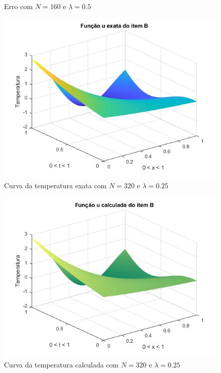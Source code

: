 \documentclass[12pt]{article}
\begin{document}
\begin{spacing}{1.5}
\begin{figure}
    \caption{Erro com $N=160$ e $\lambda=0.5$}
    \label{fig:B_n160lambda0-5_erro}
\end{figure}


\begin{figure}
    \centering
    \includegraphics[width=0.8\linewidth]{Primeira_Tarefa/ItemB/n320_lambda0-25_exata.png}
    \caption{Curva da temperatura exata com $N=320$ e $\lambda=0.25$}
    \label{fig:B_n320lambda0-25_exata}
\end{figure}
\begin{figure}
    \centering
    \includegraphics[width=0.8\linewidth]{Primeira_Tarefa/ItemB/n320_lambda0-25_calc.png}
    \caption{Curva da temperatura calculada com $N=320$ e $\lambda=0.25$}
    \label{fig:B_n320lambda0-25_calc}
\end{figure}
\begin{figure}
    \centering

\end{figure}
\end{spacing}
\end{document}
